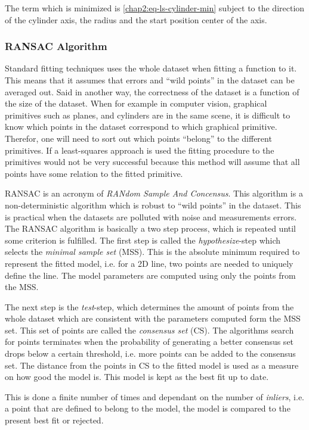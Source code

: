 The term which is minimized is \eqref{chap2:eq-ls-cylinder-min} subject to the direction
of the cylinder axis, the radius and the start position center of the axis. 


\subsubsection{RANSAC Algorithm}
Standard fitting techniques uses the whole dataset when fitting a function to it. This
means that it assumes that errors and ``wild points'' in the dataset can be averaged out.
Said in another way, the correctness of the dataset is a function of the size of the
dataset. When for example in computer vision, graphical primitives such as planes, and
cylinders are in the same scene, it is difficult to know which points in the dataset
correspond to which graphical primitive. Therefor, one will need to sort out which points
``belong'' to the different primitives. If a least-squares approach is used the fitting
procedure to the primitives would not be very successful because this method will assume
that all points have some relation to the fitted primitive. \cite{ransac}

RANSAC is an acronym of \emph{RANdom Sample And Concensus}. This algorithm is a
non-deterministic algorithm which is robust to ``wild points'' in the dataset. This is
practical when the datasets are polluted with noise and measurements errors.
The RANSAC algorithm is basically a two step process, which is repeated until some
criterion is fulfilled. The first step is called the \emph{hypothesize}-step which selects
the \emph{minimal sample set} (MSS). This is the absolute minimum required to represent
the fitted model, i.e. for a 2D line, two points are needed to uniquely define the
line. The model parameters are computed using only the points from the MSS.

The next step is the \emph{test}-step, which determines the amount of points from the
whole dataset which are consistent with the parameters computed form the MSS set. This set
of points are called the \emph{consensus set} (CS). The algorithms search for points
terminates when the probability of generating a better consensus set drops below a certain threshold, i.e.
more points can be added to the consensus set. The distance from the points in CS to the 
fitted model is used as a measure on how good the model is. This model is kept as the best
fit up to date. \cite{ransac-dummies}

This is done a finite number of times and dependant on the number of \emph{inliers}, i.e.
a point that are defined to belong to the model, the model is compared to the present best
fit or rejected.

